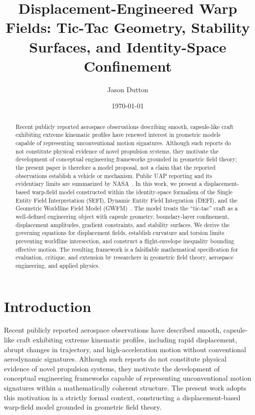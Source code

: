 \documentclass[aip,adv,reprint,floatfix]{revtex4-2}
\begin{document}
\title{Displacement-Engineered Warp Fields: Tic-Tac Geometry, Stability Surfaces, and Identity-Space Confinement}

\author{Jason Dutton}

\date{\today}

\begin{abstract}
Recent publicly reported aerospace observations describing smooth, capsule-like craft exhibiting extreme kinematic profiles have renewed interest in geometric models capable of representing unconventional motion signatures. Although such reports do not constitute physical evidence of novel propulsion systems, they motivate the development of conceptual engineering frameworks grounded in geometric field theory; the present paper is therefore a model proposal, not a claim that the reported observations establish a vehicle or mechanism. Public UAP reporting and its evidentiary limits are summarized by NASA~\cite{NASA2023UAP}. In this work, we present a displacement-based warp-field model constructed within the identity-space formalism of the Single Entity Field Interpretation (SEFI), Dynamic Entity Field Integration (DEFI), and the Geometric Worldline Field Model (GWFM)~\cite{DuttonSEFI2026,DuttonGWFM2026,DuttonUnified2026}. The model treats the ``tic-tac'' craft as a well-defined engineering object with capsule geometry, boundary-layer confinement, displacement amplitudes, gradient constraints, and stability surfaces. We derive the governing equations for displacement fields, establish curvature and torsion limits preventing worldline intersection, and construct a flight-envelope inequality bounding effective motion. The resulting framework is a falsifiable mathematical specification for evaluation, critique, and extension by researchers in geometric field theory, aerospace engineering, and applied physics.
\end{abstract}

\maketitle
\section{Introduction}

Recent publicly reported aerospace observations have described smooth, capsule-like craft exhibiting extreme kinematic profiles, including rapid displacement, abrupt changes in trajectory, and high-acceleration motion without conventional aerodynamic signatures. Although such reports do not constitute physical evidence of novel propulsion systems, they motivate the development of conceptual engineering frameworks capable of representing unconventional motion signatures within a mathematically coherent structure. The present work adopts this motivation in a strictly formal context, constructing a displacement-based warp-field model grounded in geometric field theory.
\end{document}
